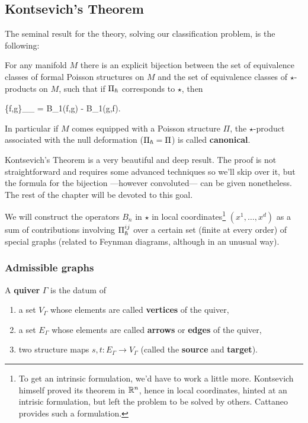 \documentclass[main.tex]{subfiles}
\begin{document}
\subsection{Kontsevich's Theorem}
The seminal result for the theory, solving our classification problem, is the following:

\begin{theorem}
	For any manifold $M$ there is an explicit bijection between the set of equivalence classes of formal Poisson structures on $M$ and the set of equivalence classes of $\star$-products on $M$, such that if $\Pi_{\boldsymbol\hslash}$ corresponds to $\star$, then
	\begin{eqalign}
	\label{eq:corr_condition}
		\{f,g\}_{\Pi_\planck} = B_1(f,g) - B_1(g,f).
	\end{eqalign}
	In particular if $M$ comes equipped with a Poisson structure $\Pi$, the $\star$-product associated with the null deformation ($\Pi_{\boldsymbol\hslash} = \Pi$) is called \textbf{canonical}.
\end{theorem}

Kontsevich's Theorem is a very beautiful and deep result. The proof is not straightforward and requires some advanced techniques so we'll skip over it, but the formula for the bijection ---however convoluted--- can be given nonetheless. The rest of the chapter will be devoted to this goal.

We will construct the operators $B_n$ in $\star$ in local coordinates\footnote{To get an intrinsic formulation, we'd have to work a little more. Kontsevich himself proved its theorem in $\mathbb{R}^n$, hence in local coordinates, hinted at an intrisic formulation, but left the problem to be solved by others. Cattaneo provides such a formulation.} $(x^1, \ldots, x^d)$ as a sum of contributions involving $\Pi^{ij}_{\boldsymbol\hslash}$ over a certain set (finite at every order) of special graphs (related to Feynman diagrams, although in an unusual way).

\subsubsection{Admissible graphs}
\begin{definition}
	A \textbf{quiver} $\Gamma$ is the datum of
	\begin{enumerate}
		\item a set $V_\Gamma$ whose elements are called \textbf{vertices} of the quiver,
		\item a set $E_\Gamma$ whose elements are called \textbf{arrows} or \textbf{edges} of the quiver,
		\item two structure maps $s,t : E_\Gamma \to V_\Gamma$ (called the \textbf{source} and \textbf{target}).
	\end{enumerate}
\end{definition}
\end{document}
